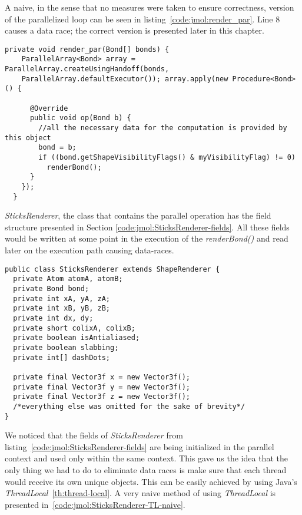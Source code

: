 A naive, in the sense that no measures were taken to ensure correctness, version
of the parallelized loop can be seen in listing~\ref{code:jmol:render_par}. Line
8 causes a data race; the correct version is presented later in this chapter.

\begin{lstlisting}[caption={The incorrect parallelized version of
listing~\ref{code:jmol:render_seq}}, label = {code:jmol:render_par}]
 private void render_par(Bond[] bonds) {
    ParallelArray<Bond> array = ParallelArray.createUsingHandoff(bonds,
    ParallelArray.defaultExecutor()); array.apply(new Procedure<Bond>() {

      @Override
      public void op(Bond b) {
        //all the necessary data for the computation is provided by this object
        bond = b;
        if ((bond.getShapeVisibilityFlags() & myVisibilityFlag) != 0)
          renderBond();
      }
    });
  }
\end{lstlisting}

\emph{SticksRenderer}, the class that contains the parallel operation has the
field structure presented in Section \ref{code:jmol:SticksRenderer-fields}. All
these fields would be written at some point in the execution of the
\emph{renderBond()} and read later on the execution path causing data-races.

\begin{lstlisting}[caption={Some of the fields in SticksRenderer}, label =
{code:jmol:SticksRenderer-fields}]
public class SticksRenderer extends ShapeRenderer {
  private Atom atomA, atomB;
  private Bond bond;
  private int xA, yA, zA;
  private int xB, yB, zB;
  private int dx, dy;
  private short colixA, colixB;
  private boolean isAntialiased;
  private boolean slabbing;
  private int[] dashDots;
  
  private final Vector3f x = new Vector3f();
  private final Vector3f y = new Vector3f();
  private final Vector3f z = new Vector3f();
  /*everything else was omitted for the sake of brevity*/
}
\end{lstlisting}

We noticed that the fields of \emph{SticksRenderer} from
listing~\ref{code:jmol:SticksRenderer-fields} are being initialized in the
parallel context and used only within the same context. This gave us the idea
that the only thing we had to do to eliminate data races is make sure that each
thread would receive its own unique objects. This can be easily achieved by
using Java's \emph{ThreadLocal}~\ref{th:thread-local}. A very naive method of using
\emph{ThreadLocal} is presented in~\ref{code:jmol:SticksRenderer-TL-naive}.

